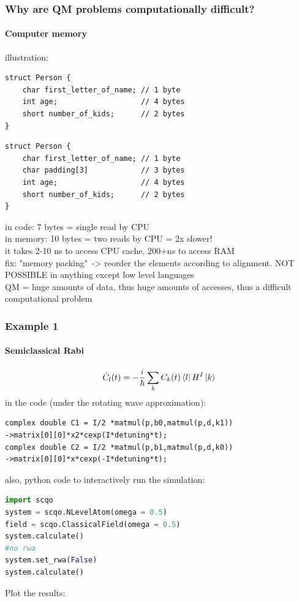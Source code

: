 \documentclass{beamer}
\begin{document}
\begin{frame}[fragile]
\frametitle{Why are QM problems computationally difficult?}
\framesubtitle{Computer memory}
illustration:
\begin{lstlisting}
struct Person {
	char first_letter_of_name; // 1 byte
	int age;                   // 4 bytes
	short number_of_kids;      // 2 bytes
}
\end{lstlisting}
\begin{lstlisting}
struct Person {
	char first_letter_of_name; // 1 byte
	char padding[3]            // 3 bytes
	int age;                   // 4 bytes
	short number_of_kids;      // 2 bytes
}
\end{lstlisting}
\end{frame}
\begin{frame}
in code: 7 bytes = single read by CPU\\
in memory: 10 bytes = two reads by CPU = 2x slower!\\
it takes 2-10 ns to access CPU cache, 200+ns to access RAM\\
fix: "memory packing"\ -> reorder the elements according to alignment. NOT POSSIBLE in anything except low level languages\\
QM = huge amounts of data, thus huge amounts of accesses, thus a difficult computational problem
\end{frame}
\begin{frame}[fragile]
\frametitle{Example 1}
\framesubtitle{Semiclassical Rabi}
\begin{align}
\dot{C}_l (t) = -\frac{i}{\hbar}\sum _k C_k(t) \bra{l} H^I \ket{k}
\end{align}
in the code (under the rotating wave approximation):
\begin{lstlisting}
complex double C1 = I/2 *matmul(p,b0,matmul(p,d,k1))
->matrix[0][0]*x2*cexp(I*detuning*t);
complex double C2 = I/2 *matmul(p,b1,matmul(p,d,k0))
->matrix[0][0]*x*cexp(-I*detuning*t);
\end{lstlisting}
\end{frame}
\begin{frame}[fragile]
also, python code to interactively run the simulation:
\begin{lstlisting}[language=python]
import scqo
system = scqo.NLevelAtom(omega = 0.5) 
field = scqo.ClassicalField(omega = 0.5)
system.calculate()
#no rwa
system.set_rwa(False)
system.calculate()
\end{lstlisting}
Plot the results:

\end{frame}
\end{document}
